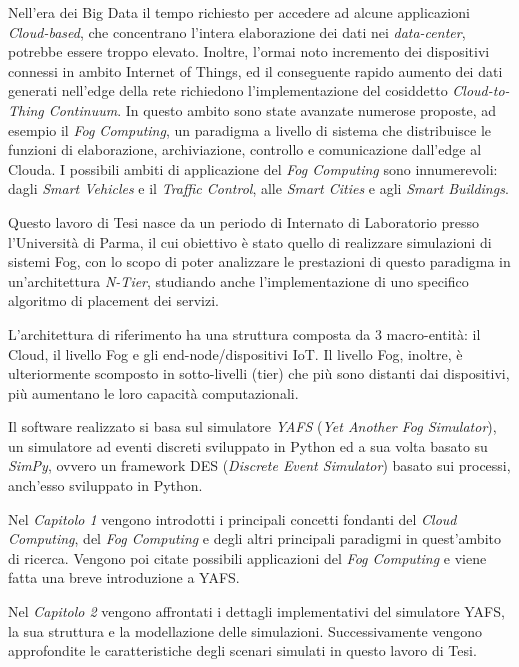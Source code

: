 \documentclass[a4paper,11pt]{article}
\begin{document}
	\maketitle

Nell'era dei Big Data il tempo richiesto per accedere ad alcune applicazioni \textit{Cloud-based}, che concentrano l'intera elaborazione dei dati nei \textit{data-center}, potrebbe essere troppo elevato. Inoltre, l'ormai noto incremento dei dispositivi connessi in ambito Internet of Things, ed il conseguente rapido aumento dei dati generati nell'edge della rete richiedono l'implementazione del cosiddetto \textit{Cloud-to-Thing Continuum}. In questo ambito sono state avanzate numerose proposte, ad esempio il \textit{Fog Computing}, un paradigma a livello di sistema che distribuisce le funzioni di elaborazione, archiviazione, controllo e comunicazione dall'edge al Clouda. I possibili ambiti di applicazione del \textit{Fog Computing} sono innumerevoli: dagli \textit{Smart Vehicles} e il \textit{Traffic Control}, alle \textit{Smart Cities} e agli \textit{Smart Buildings}.

Questo lavoro di Tesi nasce da un periodo di Internato di Laboratorio presso l'Università di Parma, il cui obiettivo è stato quello di realizzare simulazioni di sistemi Fog, con lo scopo di poter analizzare le prestazioni di questo paradigma in un'architettura \textit{N-Tier}, studiando anche l'implementazione di uno specifico algoritmo di placement dei servizi.

L'architettura di riferimento ha una struttura composta da 3 macro-entità: il Cloud, il livello Fog e gli end-node/dispositivi IoT. Il livello Fog, inoltre, è ulteriormente scomposto in sotto-livelli (tier) che più sono distanti dai dispositivi, più aumentano le loro capacità computazionali.

Il software realizzato si basa sul simulatore \textit{YAFS} (\textit{Yet Another Fog Simulator}), un simulatore ad eventi discreti sviluppato in Python ed a sua volta basato su \textit{SimPy}, ovvero un framework DES (\textit{Discrete Event Simulator}) basato sui processi, anch'esso sviluppato in Python.

Nel \textit{Capitolo 1} vengono introdotti i principali concetti fondanti del \textit{Cloud Computing}, del \textit{Fog Computing} e degli altri principali paradigmi in quest'ambito di ricerca. Vengono poi citate possibili applicazioni del \textit{Fog Computing} e viene fatta una breve introduzione a YAFS.

Nel \textit{Capitolo 2} vengono affrontati i dettagli implementativi del simulatore YAFS, la sua struttura e la modellazione delle simulazioni. Successivamente vengono approfondite le caratteristiche degli scenari simulati in questo lavoro di Tesi.
\end{document}
